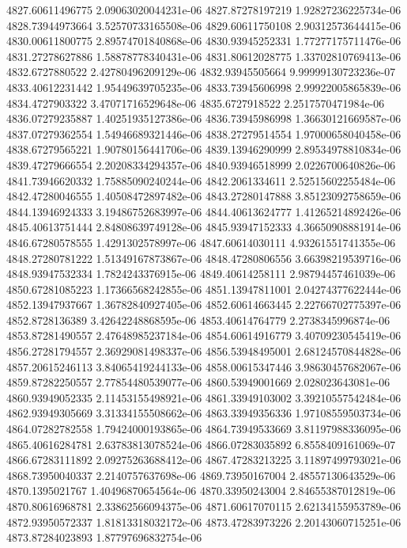 {4827.60611496775 2.09063020044231e-06
4827.87278197219 1.92827236225734e-06
4828.73944973664 3.52570733165508e-06
4829.60611750108 2.90312573644415e-06
4830.00611800775 2.89574701840868e-06
4830.93945252331 1.77277175711476e-06
4831.27278627886 1.58878778340431e-06
4831.80612028775 1.33702810769413e-06
4832.6727880522 2.42780496209129e-06
4832.93945505664 9.99999130723236e-07
4833.40612231442 1.95449639705235e-06
4833.73945606998 2.99922005865839e-06
4834.4727903322 3.47071716529648e-06
4835.6727918522 2.2517570471984e-06
4836.07279235887 1.40251935127386e-06
4836.73945986998 1.36630121669587e-06
4837.07279362554 1.54946689321446e-06
4838.27279514554 1.97000658040458e-06
4838.67279565221 1.90780156441706e-06
4839.13946290999 2.89534978810834e-06
4839.47279666554 2.20208334294357e-06
4840.93946518999 2.0226700640826e-06
4841.73946620332 1.75885090240244e-06
4842.2061334611 2.52515602255484e-06
4842.47280046555 1.40508472897482e-06
4843.27280147888 3.85123092758659e-06
4844.13946924333 3.19486752683997e-06
4844.40613624777 1.41265214892426e-06
4845.40613751444 2.84808639749128e-06
4845.93947152333 4.36650908881914e-06
4846.67280578555 1.4291302578997e-06
4847.60614030111 4.93261551741355e-06
4848.27280781222 1.51349167873867e-06
4848.47280806556 3.66398219539716e-06
4848.93947532334 1.7824243376915e-06
4849.40614258111 2.98794457461039e-06
4850.67281085223 1.17366568242855e-06
4851.13947811001 2.04274377622444e-06
4852.13947937667 1.36782840927405e-06
4852.60614663445 2.22766702775397e-06
4852.8728136389 3.42642248868595e-06
4853.40614764779 2.2738345996874e-06
4853.87281490557 2.47648985237184e-06
4854.60614916779 3.40709230545419e-06
4856.27281794557 2.36929081498337e-06
4856.53948495001 2.68124570844828e-06
4857.20615246113 3.84065419244133e-06
4858.00615347446 3.98630457682067e-06
4859.87282250557 2.77854480539077e-06
4860.53949001669 2.028023643081e-06
4860.93949052335 2.11453155498921e-06
4861.33949103002 3.39210557542484e-06
4862.93949305669 3.31334155508662e-06
4863.33949356336 1.97108559503734e-06
4864.07282782558 1.79424000193865e-06
4864.73949533669 3.81197988336095e-06
4865.40616284781 2.63783813078524e-06
4866.07283035892 6.8558409161069e-07
4866.67283111892 2.09275263688412e-06
4867.47283213225 3.11897499793021e-06
4868.73950040337 2.2140757637698e-06
4869.73950167004 2.48557130643529e-06
4870.1395021767 1.40496870654564e-06
4870.33950243004 2.84655387012819e-06
4870.80616968781 2.33862566094375e-06
4871.60617070115 2.62134155953789e-06
4872.93950572337 1.81813318032172e-06
4873.47283973226 2.20143060715251e-06
4873.87284023893 1.87797696832754e-06
}
